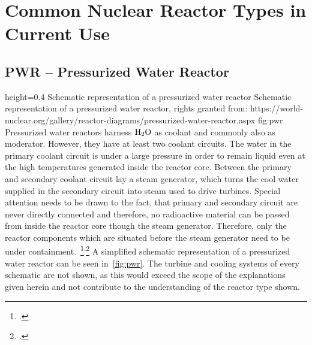 \chapter{Common Nuclear Reactor Types in Current Use} 
\section{PWR – Pressurized Water Reactor}
    {height=0.4\textheight}
    {Schematic representation of a pressurized water reactor}
    {Schematic representation of a pressurized water reactor, rights granted from: https://world-nuclear.org/gallery/reactor-diagrams/pressurized-water-reactor.aspx}
    {fig:pwr}
Pressurized water reactors harness $\ce{H_{2}O}$ as coolant and commonly also as moderator. However, they have at least
two coolant circuits. The water in the primary coolant circuit is under a large pressure in order
to remain liquid even at the high temperatures generated inside the reactor core. Between the primary
and secondary coolant circuit lay a steam generator, which turns the cool water supplied in the secondary circuit
into steam used to drive turbines. Special attention needs to be drawn to the fact, that primary and secondary
circuit are never directly connected and therefore, no radioactive material can be passed from inside the reactor core
though the steam generator. Therefore, only the reactor components which are situated before the steam generator
need to be under containment.~\footcite{WNPR}\textsuperscript{,}\footcite[14-84]{engHandbook} 
A simplified schematic representation of a pressurized water reactor can be seen in~\ref{fig:pwr}. The
turbine and cooling systems of every schematic are not shown, as this would exceed the scope of the
explanations given herein and not contribute to the understanding of the reactor type shown.
\pagebreak
